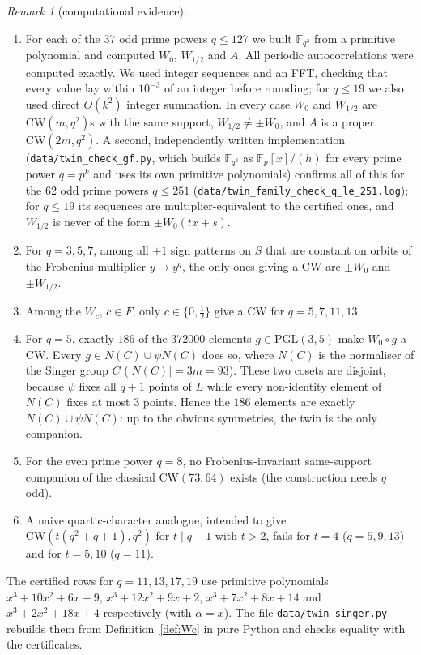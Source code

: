 \documentclass[11pt]{article}
\numberwithin{equation}{section}
\theoremstyle{definition}
\theoremstyle{remark}
\newtheorem{remark}[theorem]{Remark}
\newcommand{\F}{\mathbb F}
\newcommand{\CW}{\mathrm{CW}}
\begin{document}
\begin{remark}[computational evidence]\label{rem:evidence}
\leavevmode
\begin{enumerate}
\item For each of the 37 odd prime powers $q\le127$ we built $\F_{q^3}$ from a primitive
polynomial and computed $W_0$, $W_{1/2}$ and $A$. All periodic autocorrelations were computed
exactly. We used integer sequences and an FFT, checking that every value lay within $10^{-3}$ of
an integer before rounding; for $q\le19$ we also used direct $O(k^2)$ integer summation.
In every case $W_0$ and $W_{1/2}$ are $\CW(m,q^2)$s with the same support, $W_{1/2}\neq\pm W_0$,
and $A$ is a proper $\CW(2m,q^2)$. A second, independently written implementation
(\texttt{data/twin\_check\_gf.py}, which builds $\F_{q^3}$ as $\F_p[x]/(h)$ for every prime power
$q=p^k$ and uses its own primitive polynomials) confirms all of this for the 62 odd prime powers
$q\le251$ (\texttt{data/twin\_family\_check\_q\_le\_251.log}); for $q\le19$ its sequences are
multiplier-equivalent to the certified ones, and $W_{1/2}$ is never of the form $\pm W_0(tx+s)$.
\item For $q=3,5,7$, among all $\pm1$ sign patterns on $S$ that are constant on orbits of the
Frobenius multiplier $y\mapsto y^q$, the only ones giving a $\CW$ are $\pm W_0$ and
$\pm W_{1/2}$.
\item Among the $W_c$, $c\in F$, only $c\in\{0,\frac12\}$ give a $\CW$ for $q=5,7,11,13$.
\item For $q=5$, exactly $186$ of the $372000$ elements $g\in\mathrm{PGL}(3,5)$ make $W_0\circ g$
a $\CW$. Every $g\in N(C)\cup\psi N(C)$ does so, where $N(C)$ is the normaliser of the Singer
group $C$ ($|N(C)|=3m=93$). These two cosets are disjoint, because $\psi$ fixes all $q+1$ points of
$L$ while every non-identity element of $N(C)$ fixes at most $3$ points. Hence the $186$ elements
are exactly $N(C)\cup\psi N(C)$: up to the obvious symmetries, the twin is the only companion.
\item For the even prime power $q=8$, no Frobenius-invariant same-support companion of the
classical $\CW(73,64)$ exists (the construction needs $q$ odd).
\item A naive quartic-character analogue, intended to give $\CW(t(q^2+q+1),q^2)$ for
$t\mid q-1$ with $t>2$, fails for $t=4$ ($q=5,9,13$) and for $t=5,10$ ($q=11$).
\end{enumerate}
The certified rows for $q=11,13,17,19$ use primitive polynomials $x^3+10x^2+6x+9$,
$x^3+12x^2+9x+2$, $x^3+7x^2+8x+14$ and $x^3+2x^2+18x+4$ respectively (with $\alpha=x$). The file
\texttt{data/twin\_singer.py} rebuilds them from Definition~\ref{def:Wc} in pure Python and checks
equality with the certificates.
\end{remark}
\end{document}
